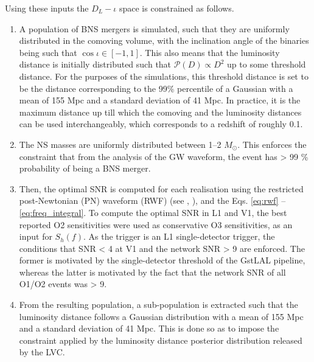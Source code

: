     Using these inputs the $D_L-\iota$ space is constrained as follows.
    \begin{enumerate}

        \item A population of BNS mergers is simulated, such that they are uniformly
            distributed in the comoving volume, with the inclination angle of the
            binaries being such that $\cos \iota \in [-1, 1]$. This also means that the
            luminosity distance is initially distributed such that $\mathcal{P}(D)
            \propto D^2$ up to some threshold distance. For the purposes of the
            simulations, this threshold distance is set to be the distance corresponding
            to the 99\% percentile of a Gaussian with a mean of 155 Mpc and a standard
            deviation of 41 Mpc. In practice, it is the maximum distance up till which
            the comoving and the luminosity distances can be used interchangeably, which
            corresponds to a redshift of roughly 0.1.

        \item The NS masses are uniformly distributed between 1--2 $M_{\odot}$. This
            enforces the constraint that from the analysis of the GW waveform, the event
            has > 99 \% probability of being a BNS merger.

        \item Then, the optimal SNR is computed for each realisation using the
            restricted post-Newtonian (PN) waveform (RWF) (see \cite{cutler_1994},
            \cite{kastha_2020}), and the Eqs. \ref{eq:rwf} -- \ref{eq:freq_integral}.
            To compute the optimal SNR in L1 and V1, the best reported O2 sensitivities
            were used as conservative O3 sensitivities, as an input for $S_h(f)$.  As
            the trigger is an L1 single-detector trigger, the conditions that SNR < 4 at
            V1 and the network SNR > 9 are enforced. The former is motivated by the
            single-detector threshold of the GstLAL pipeline, whereas the latter is
            motivated by the fact that the network SNR of all O1/O2 events was > 9.

        \item From the resulting population, a sub-population is extracted such that the
            luminosity distance follows a Gaussian distribution with a mean of 155 Mpc
            and a standard deviation of 41 Mpc. This is done so as to impose the
            constraint applied by the luminosity distance posterior distribution
            released by the LVC.

    \end{enumerate}

